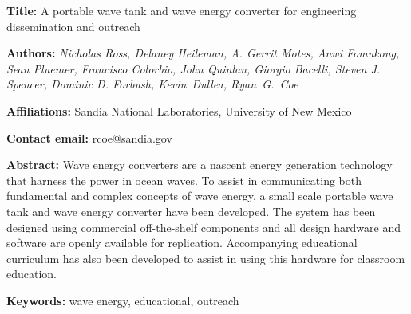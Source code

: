 \documentclass[11pt, letterpaper]{article}
\begin{document}
\begin{flushleft}


\setlength{\parindent}{0pt}
\setlength{\parskip}{10pt}

\textbf{Title:} A portable wave tank and wave energy converter for engineering dissemination and outreach

\textbf{Authors:} \textit{Nicholas Ross, Delaney Heileman, A. Gerrit Motes, Anwi Fomukong, Sean Pluemer, Francisco Colorbio, John Quinlan, Giorgio Bacelli, Steven J. Spencer, Dominic D. Forbush, Kevin~Dullea, Ryan~G.~Coe}

\textbf{Affiliations:} Sandia National Laboratories, University of New Mexico

\textbf{Contact email:} rcoe@sandia.gov

\textbf{Abstract:} Wave energy converters are a nascent energy generation technology that harness the power in ocean waves.
To assist in communicating both fundamental and complex concepts of wave energy, a small scale portable wave tank and wave energy converter have been developed.
The system has been designed using commercial off-the-shelf components and all design hardware and software are openly available for replication.
Accompanying educational curriculum has also been developed to assist in using this hardware for classroom education.

\textbf{Keywords:} wave energy, educational, outreach


\end{flushleft}
\end{document}
